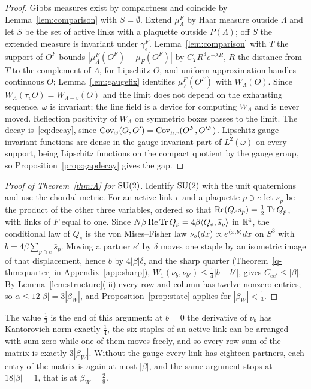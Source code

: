 \begin{proof}
Gibbs measures exist by compactness and coincide by Lemma~\ref{lem:comparison}
with $S=\emptyset$. Extend $\mu^F_\Lambda$ by Haar measure outside $\Lambda$ and
let $S$ be the set of active links with a plaquette outside $P(\Lambda)$; off $S$
the extended measure is invariant under $\gamma^F_e$. Lemma~\ref{lem:comparison}
with $T$ the support of $O^F$ bounds $|\mu^F_\Lambda(O^F)-\mu_F(O^F)|$ by
$C_TR^3e^{-\lambda R}$, $R$ the distance from $T$ to the complement of $\Lambda$,
for Lipschitz $O$, and uniform approximation handles continuous $O$;
Lemma~\ref{lem:gaugefix} identifies $\mu^F_\Lambda(O^F)$ with $W_\Lambda(O)$. Since
$W_\Lambda(\tau_vO)=W_{\Lambda-v}(O)$ and the limit does not depend on the
exhausting sequence, $\omega$ is invariant; the line field is a device for
computing $W_\Lambda$ and is never moved. Reflection positivity of $W_\Lambda$ on
symmetric boxes passes to the limit. The decay is~\eqref{eq:decay}, since
$\operatorname{Cov}_\omega(O,O')=\operatorname{Cov}_{\mu_F}(O^F,O'^F)$. Lipschitz gauge-invariant functions
are dense in the gauge-invariant part of $L^2(\omega)$ on every support, being
Lipschitz functions on the compact quotient by the gauge group, so
Proposition~\ref{prop:gapdecay} gives the gap.
\end{proof}

\begin{proof}[Proof of Theorem~\ref{thm:A} for $\mathrm{SU}(2)$]
Identify $\mathrm{SU}(2)$ with the unit quaternions and use the chordal metric. For an
active link $e$ and a plaquette $p\ni e$ let $s_p$ be the product of the other
three variables, ordered so that $\operatorname{Re}(Q_es_p)=\frac12\operatorname{Tr} Q_p$, with
links of $F$ equal to one. Since $N\beta\operatorname{Re}\operatorname{Tr} Q_p=4\beta\langle Q_e,\bar s_p\rangle$ in
$\mathbb{R}^4$, the conditional law of $Q_e$ is the von Mises--Fisher law $\nu_b(dx)
\propto e^{\langle x,b\rangle}dx$ on $S^3$ with $b=4\beta\sum_{p\ni e}\bar s_p$. Moving a
partner $e'$ by $\delta$ moves one staple by an isometric image of that
displacement, hence $b$ by $4|\beta|\delta$, and the sharp
quarter (Theorem~\ref{q-thm:quarter} in Appendix~\ref{app:sharp}), $W_1(\nu_b,\nu_{b'})\le\frac14|b-b'|$, gives
$C_{ee'}\le|\beta|$. By Lemma~\ref{lem:structure}(iii) every row and column has
twelve nonzero entries, so $\alpha\le12|\beta|=3|\beta_W|$, and
Proposition~\ref{prop:state} applies for $|\beta_W|<\frac13$.
\end{proof}

The value $\frac13$ is the end of this argument: at $b=0$ the derivative of
$\nu_b$ has Kantorovich norm exactly $\frac14$, the six staples of an active
link can be arranged with sum zero while one of them moves freely, and so
every row sum of the matrix is exactly $3|\beta_W|$. Without the gauge every
link has eighteen partners, each entry of the matrix is again at most
$|\beta|$, and the same argument stops at $18|\beta|=1$, that is at
$\beta_W=\frac29$.

